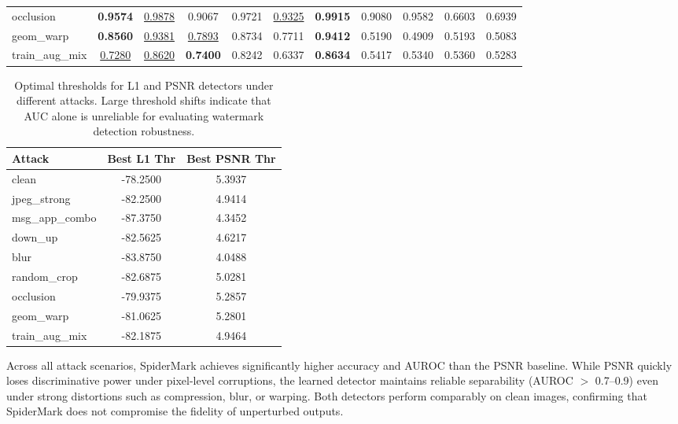 \begin{table}[h]
{\begin{tabular}{lcccccccccc}
occlusion       
& \textbf{0.9574} & \underline{0.9878}
& 0.9067 & 0.9721
& \underline{0.9325} & \textbf{0.9915}
& 0.9080 & 0.9582
& 0.6603 & 0.6939
\\

geom\_warp      
& \textbf{0.8560} & \underline{0.9381}
& \underline{0.7893} & 0.8734
& 0.7711 & \textbf{0.9412}
& 0.5190 & 0.4909
& 0.5193 & 0.5083
\\

train\_aug\_mix 
& \underline{0.7280} & \underline{0.8620}
& \textbf{0.7400} & 0.8242 
& 0.6337 & \textbf{0.8634}
& 0.5417 & 0.5340
& 0.5360 & 0.5283
\\

\bottomrule
\end{tabular}

}
\end{table}





\begin{table}[h!]
\centering
\begin{tabular}{lcc}
\hline
\textbf{Attack} & \textbf{Best L1 Thr} & \textbf{Best PSNR Thr} \\
\hline
clean          & -78.2500  & 5.3937 \\
jpeg\_strong   & -82.2500  & 4.9414 \\
msg\_app\_combo & -87.3750  & 4.3452 \\
down\_up       & -82.5625  & 4.6217 \\
blur           & -83.8750  & 4.0488 \\
random\_crop   & -82.6875  & 5.0281 \\
occlusion      & -79.9375  & 5.2857 \\
geom\_warp     & -81.0625  & 5.2801 \\
train\_aug\_mix & -82.1875 & 4.9464 \\
\hline
\end{tabular}
\caption{Optimal thresholds for L1 and PSNR detectors under different attacks. Large threshold shifts indicate that AUC alone is unreliable for evaluating watermark detection robustness.}
\label{tab:threshold_shift}
\end{table}


Across all attack scenarios, SpiderMark achieves significantly higher accuracy and AUROC than the PSNR baseline.  
While PSNR quickly loses discriminative power under pixel-level corruptions, the learned detector maintains reliable separability (AUROC \(>\) 0.7–0.9) even under strong distortions such as compression, blur, or warping.  
Both detectors perform comparably on clean images, confirming that SpiderMark does not compromise the fidelity of unperturbed outputs.

